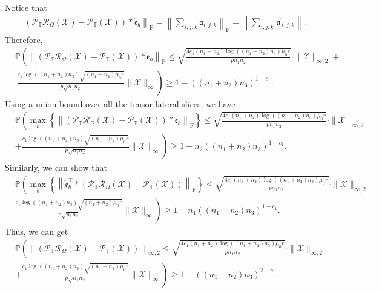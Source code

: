 \documentclass[twoside,12pt]{article}
\def\fro{{\mathrm{F}}}
\def\fro{{\mathrm{F}}}
\def\mrme{{\mathring{\mathfrak{e}}}}
\newcommand{\lx}[1]{\textcolor{pink}{#1}}
\begin{document}
Notice that 
\begin{align*}
&\left\|(\mathcal{P}_{\mathbb{T}}\mathcal{R}_{\Omega}(\mathcal{X})-\mathcal{P}_{\mathbb{T}}(\mathcal{X}))*\mrme_{b}\right\|_{\fro}=\left\|\sum\limits_{i,j,k}\mathfrak{a}_{i,j,k}\right\|_{\fro}=\left\|\sum\limits_{i,j,k}\vec{\mathfrak{a}}_{i,j,k}\right\|.
\end{align*}
Therefore, 
\begin{align*}
&\mathbb{P}\left(\left\|(\mathcal{P}_{\mathbb{T}}\mathcal{R}_{\Omega}(\mathcal{X})-\mathcal{P}_{\mathbb{T}}(\mathcal{X}))*\mrme_{b}\right\|_{\fro}\leq\sqrt{\frac{4c_1(n_{1}+n_{2})\log\left((n_1+n_2)n_3\right)\mu_{0}r}{pn_{1}n_{2}}}\cdot\|\mathcal{X}\|_{\infty,2} + \right.\\
&~ \left.\frac{c_1\log((n_1+n_2)n_3)\sqrt{(n_1+n_2)\mu_{0}r}}{p\sqrt{n_{1}n_{2}}}\|\mathcal{X}\|_{\infty}\right) \geq 1-((n_1+n_2)n_3)^{1-c_1}.
\end{align*}
Using a union bound over all the tensor lateral slices, we have 
\begin{align*}
&\mathbb{P}\left(\max\limits_{b}\left\{\left\|(\mathcal{P}_{\mathbb{T}}\mathcal{R}_{\Omega}(\mathcal{X})-\mathcal{P}_{\mathbb{T}}(\mathcal{X}))*\mrme_{b}\right\|_{\fro}\right\}\leq\sqrt{\frac{4c_1(n_{1}+n_{2})\log\left((n_1+n_2)n_3\right)\mu_{0}r}{pn_{1}n_{2}}}\cdot\|\mathcal{X}\|_{\infty,2} \right.\\
&\left.+  \frac{c_1\log((n_1+n_2)n_3)\sqrt{(n_1+n_2)\mu_{0}r}}{p\sqrt{n_{1}n_{2}}}\|\mathcal{X}\|_{\infty}\right)  \geq 1-n_2((n_1+n_2)n_3)^{1-c_1}.
\end{align*}
Similarly, we can show that 
\begin{align*}
&\mathbb{P}\left( \max_{b}\left\{\left\|\mrme_{b}^{\top}*(\mathcal{P}_{\mathbb{T}}\mathcal{R}_{\Omega}(\mathcal{X})-\mathcal{P}_{\mathbb{T}}(\mathcal{X}))\right\|_{\fro}\right\}\leq\sqrt{\frac{4c_1(n_{1}+n_{2})\log\left((n_1+n_2)n_3\right)\mu_{0}r}{pn_{1}n_{2}}}\cdot\|\mathcal{X}\|_{\infty,2} + \right.\\
&\left.\frac{c_1\log((n_1+n_2)n_3)\sqrt{(n_1+n_2)\mu_{0}r}}{p\sqrt{n_{1}n_{2}}}\|\mathcal{X}\|_{\infty}\right)\geq 1-n_1((n_1+n_2)n_3)^{1-c_1}.
\end{align*}
Thus, we can get 
\begin{align*}
&\mathbb{P}\left( \left\|(\mathcal{P}_{\mathbb{T}}\mathcal{R}_{\Omega}(\mathcal{X})-\mathcal{P}_{\mathbb{T}}(\mathcal{X}))\right\|_{\infty,2}\leq\sqrt{\frac{4c_1(n_{1}+n_{2})\log\left((n_1+n_2)n_3\right)\mu_{0}r}{pn_{1}n_{2}}}\cdot\|\mathcal{X}\|_{\infty,2} \right. \\ 
&+\left.\frac{c_1\log((n_1+n_2)n_3)\sqrt{(n_1+n_2)\mu_{0}r}}{p\sqrt{n_{1}n_{2}}}\|\mathcal{X}\|_{\infty}\right)\geq 1- ((n_1+n_2)n_3)^{2-c_1}.
\end{align*}
\hfill\BlackBox\\[2mm]
\vspace{-30pt}
\end{document}
